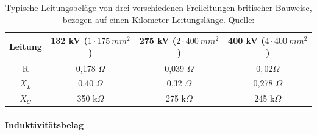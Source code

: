 \setlength{\tabcolsep}{10pt}
\renewcommand{\arraystretch}{1.5}
\begin{table}[tbhn]
\begin{center}
\noindent
\begin{tabular}{|c|ccc|}
\hline 
Leitung & 132 kV ($1\cdot 175\ mm^2$) & 275 kV ($2\cdot 400\ mm^2$) & 400 kV ($4\cdot 400\ mm^2$) \\ 
\hline 
R & 0,178 $\Omega$ & 0,039 $\Omega$ & $0,02 \Omega$ \\ 

$X_L$ & 0,40 $\Omega$ & 0,32 $\Omega$ & 0,278 $\Omega$ \\ 

$X_C$ & 350 k$\Omega$ & 275 k$\Omega$ & 245 k$\Omega$ \\ 
\hline 
\end{tabular} 
\end{center}
\caption{Typische Leitungsbeläge von drei verschiedenen Freileitungen britischer Bauweise, bezogen auf einen Kilometer Leitungslänge. Quelle: \cite{Harrison}}
\label{tab:freileitung}
\end{table}

\paragraph{Induktivitätsbelag}

